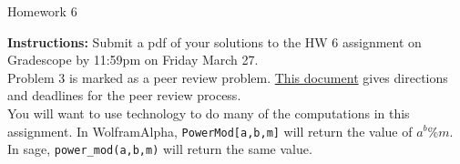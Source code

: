 \documentclass[12pt]{article}
\begin{document}
\begin{center}
{\Large Homework 6}\\


\end{center}
{\bf Instructions:} Submit a pdf of your solutions to the HW 6 assignment on Gradescope by 11:59pm on Friday March 27. \\[3pt]

\noindent Problem 3 is marked as a peer review problem. \href{https://docs.google.com/document/d/1jSw9pmMJJFUx_6dTkcUi4k4HJNIrrIIgs9zdWhAycx0/edit?usp=drive_link}{This document} gives directions and deadlines for the peer review process.
\\[3pt]

 You will want to use technology to do many of the computations in this assignment. In WolframAlpha, \verb|PowerMod[a,b,m]| will return the value of $a^b\% m$. In sage, \verb|power_mod(a,b,m)| will return the same value. \\
\end{document}
